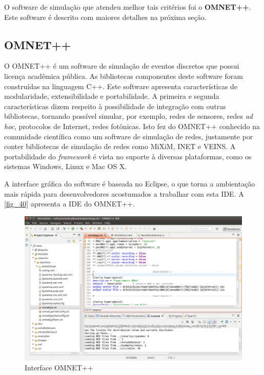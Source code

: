 \documentclass[
12pt,				%
openright,			%
oneside,			%
a4paper,			%
brazil,				%
]{abntex2}
\begin{document}
	\par O software de simulação que atendeu melhor tais critérios foi o \textbf{OMNET++}. Este software é descrito com maiores detalhes na próxima seção.
	
	\subsection{OMNET++}
	
	\par O OMNET++ é um software de simulação de eventos discretos que possui licença acadêmica pública. As bibliotecas componentes deste software foram construídas na linguagem C++. 
	Este software apresenta características de modularidade, extensibilidade e portabilidade. A primeira e segunda características dizem respeito à possibilidade de integração com outras  bibliotecas, tornando possível simular, por exemplo, redes de sensores, redes \textit{ad hoc}, protocolos de Internet, redes fotônicas. Isto fez do OMNET++ conhecido na comunidade científica como um software de simulação de redes, justamente por conter bibliotecas de simulação de redes como MiXiM, INET e VEINS. A portabilidade do \textit{framework} é vista no suporte à diversas plataformas, como os sistemas Windows, Linux e Mac OS X.
	
	\par A interface gráfica do software é baseada no Eclipse, o que torna a ambientação mais rápida para desenvolvedores acostumados a trabalhar com esta IDE. A \autoref{fig_40} apresenta a IDE do OMNET++.

	\begin{figure} [H]
		\centering
		\includegraphics[scale=.37]{figuras/cap4/40InterfaceOMNET}
		\caption{\label{fig_40}Interface OMNET++}
	\end{figure}
	
\end{document}
